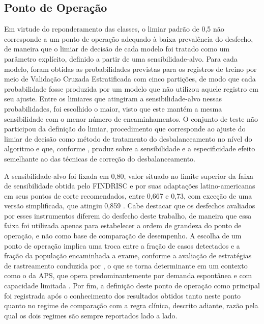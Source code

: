 \subsection{Ponto de Operação}\label{sec:ponto-operacao}
Em virtude do reponderamento das classes, o limiar padrão de 0,5 não corresponde a um ponto de operação adequado à baixa prevalência do desfecho, de maneira que o limiar de decisão de cada modelo foi tratado como um parâmetro explícito, definido a partir de uma sensibilidade-alvo. Para cada modelo, foram obtidas as probabilidades previstas para os registros de treino por meio de Validação Cruzada Estratificada com cinco partições, de modo que cada probabilidade fosse produzida por um modelo que não utilizou aquele registro em seu ajuste. Entre os limiares que atingiram a sensibilidade-alvo nessas probabilidades, foi escolhido o maior, visto que este mantém a mesma sensibilidade com o menor número de encaminhamentos. O conjunto de teste não participou da definição do limiar, procedimento que corresponde ao ajuste do limiar de decisão como método de tratamento do desbalanceamento no nível do algoritmo \cite{thabtah2020data} e que, conforme \textcite{vandengoorbergh2022harm}, produz sobre a sensibilidade e a especificidade efeito semelhante ao das técnicas de correção do desbalanceamento.

A sensibilidade-alvo foi fixada em 0,80, valor situado no limite superior da faixa de sensibilidade obtida pelo FINDRISC e por suas adaptações latino-americanas em seus pontos de corte recomendados, entre 0,667 e 0,73, com exceção de uma versão simplificada, que atingiu 0,859 \cite{CarrilloLarco2020}. Cabe destacar que os desfechos avaliados por esses instrumentos diferem do desfecho deste trabalho, de maneira que essa faixa foi utilizada apenas para estabelecer a ordem de grandeza do ponto de operação, e não como base de comparação de desempenho. A escolha de um ponto de operação implica uma troca entre a fração de casos detectados e a fração da população encaminhada a exame, conforme a avaliação de estratégias de rastreamento conduzida por \textcite{bracco2026brdmrisc}, o que se torna determinante em um contexto como o da APS, que opera predominantemente por demanda espontânea e com capacidade limitada \cite{geremia2020atenccao}. Por fim, a definição deste ponto de operação como principal foi registrada após o conhecimento dos resultados obtidos tanto neste ponto quanto no regime de comparação com a regra clínica, descrito adiante, razão pela qual os dois regimes são sempre reportados lado a lado.

